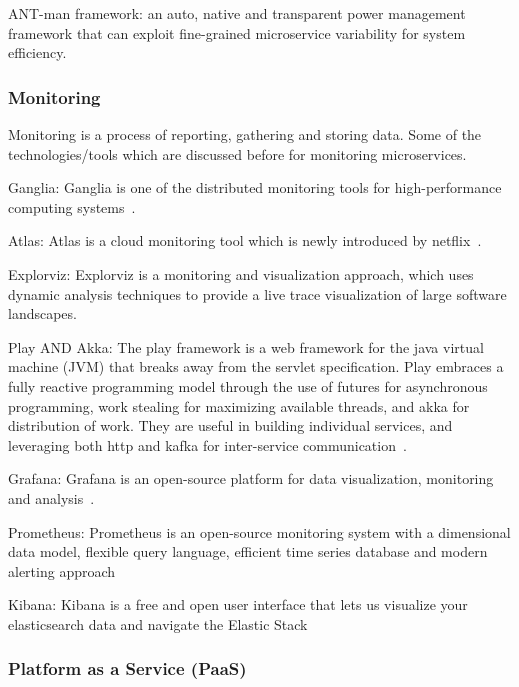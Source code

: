 \par ANT-man framework: an auto, native and transparent power management framework that can exploit fine-grained microservice variability for system efficiency\cite{Hou2020}.


\subsubsection{Monitoring}
Monitoring is a process of reporting, gathering and storing data. Some of the technologies/tools which are discussed before for monitoring microservices. 
\par Ganglia: Ganglia is one of the distributed monitoring tools for high-performance computing systems~\cite{Kristiani2020}.

\par Atlas: Atlas is a cloud monitoring tool which is newly introduced by netflix~\cite{Netflix}.

\par Explorviz: Explorviz is a monitoring and visualization approach, which uses dynamic analysis techniques to provide a live trace visualization of large software landscapes\cite{Lenga2019}.

\par Play AND Akka: The play framework is a web framework for the java virtual machine (JVM) that breaks away from the servlet specification. Play embraces a fully reactive programming model through the use of futures for asynchronous programming, work stealing for maximizing available threads, and akka for distribution of work. They are useful in building individual services, and leveraging both http and kafka for inter-service communication~\cite{khan2017}.

\par Grafana: Grafana is an open-source platform for data visualization, monitoring and analysis~\cite{KalskeM2017,Kalske2017paper}. 

\par Prometheus: Prometheus is an open-source monitoring system with a dimensional data model, flexible query language, efficient time series database and modern alerting approach~\cite{KalskeM2017, Kalske2017paper} 

\par Kibana: Kibana is a free and open user interface that lets us visualize your elasticsearch data and navigate the Elastic Stack~\cite{KalskeM2017, Kalske2017paper} 


\subsubsection{Platform as a Service (PaaS)}

